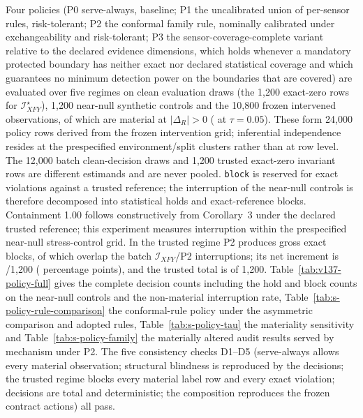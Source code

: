 \documentclass[10pt,journal,compsoc]{IEEEtran}
\newcommand{\IXFY}{\mathcal I_{XFY}}
\newcommand{\IXFYs}{\mathcal I_{XFY}^{\star}}
\begin{document}
Four policies (P0 serve-always, baseline; P1 the uncalibrated union of
per-sensor rules, risk-tolerant; P2 the conformal family rule, nominally
calibrated under exchangeability and risk-tolerant; P3 the
sensor-coverage-complete variant relative to the declared evidence dimensions,
which holds
whenever a mandatory protected boundary has neither exact nor declared
statistical coverage and which guarantees no minimum detection power on the
boundaries that are covered) are evaluated over five regimes on
\NEvalDraws{} clean evaluation draws (the 1,200 exact-zero rows for
$\IXFYs$), 1,200 near-null synthetic controls and the 10,800 frozen
intervened observations, of which \NMaterial{} are material at
$|\Delta_R|>0$ (\NMaterialFive{} at $\tau=0.05$). These form 24,000 policy
rows derived from the frozen intervention grid; inferential independence
resides at the prespecified environment/split clusters rather than at row
level. The 12,000 batch clean-decision draws and 1,200 trusted exact-zero
invariant rows are different estimands and are never pooled. \texttt{block} is reserved
for exact violations against a trusted reference; the interruption of the
near-null controls is therefore decomposed into statistical holds and
exact-reference blocks. Containment 1.00 follows constructively from
Corollary~3 under the declared trusted reference; this experiment measures
interruption within the prespecified near-null stress-control grid. In the trusted regime P2 produces
\TrustedGrossExactBlocks{} gross exact blocks, of which
\TrustedExactOverlap{} overlap the batch $\IXFY$/P2 interruptions; its net
increment is \TrustedNetAdditional{}/1,200
(\TrustedNetAdditionalPct{} percentage points), and the trusted total is
\BenignInterruptFamilyIXFYtrusted{} of 1,200. Table~\ref{tab:v137-policy-full}
gives the complete decision counts including the hold and block counts on the
near-null controls and the non-material interruption rate, Table~\ref{tab:s-policy-rule-comparison}
the conformal-rule policy under the asymmetric comparison and adopted rules,
Table~\ref{tab:s-policy-tau} the materiality sensitivity and
Table~\ref{tab:s-policy-family} the materially altered audit results served
by mechanism under P2. The
five consistency checks D1--D5 (serve-always allows every material
observation; structural blindness is reproduced by the decisions; the
trusted regime blocks every material label row and every exact violation;
decisions are total and deterministic; the composition reproduces the frozen
contract actions) all pass.





\end{document}
